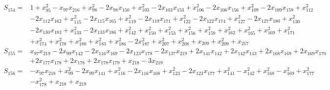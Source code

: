 \begin{align*}
S_{154}={}&1+x_{95}^{2}-x_{97}x_{216}+x_{98}^{2}-2x_{98}x_{150}+x_{103}^{2}-2x_{103}x_{153}+x_{106}^{2}-2x_{106}x_{156}+x_{109}^{2}-2x_{109}x_{159}+x_{112}^{2}\\
{}&-2x_{112}x_{162}+x_{115}^{2}-2x_{115}x_{165}+x_{119}^{2}-2x_{119}x_{171}+x_{122}^{2}-2x_{122}x_{174}+x_{127}^{2}-2x_{127}x_{180}+x_{130}^{2}\\
{}&-2x_{130}x_{183}+x_{133}^{2}-2x_{133}x_{186}+x_{142}^{2}+x_{150}^{2}+x_{153}^{2}+x_{156}^{2}+x_{159}^{2}+x_{162}^{2}+x_{165}^{2}+x_{169}^{2}+x_{171}^{2}\\
{}&+x_{174}^{2}+x_{178}^{2}+x_{180}^{2}+x_{183}^{2}+x_{186}^{2}-2x_{187}^{2}+x_{207}^{2}+x_{208}^{2}+x_{209}+x_{209}^{2}+x_{217}
\end{align*}
\begin{align*}
S_{155}={}&x_{97}x_{219}-2x_{99}x_{142}-2x_{116}x_{169}-2x_{123}x_{178}-2x_{137}x_{219}+2x_{141}x_{142}+2x_{142}x_{143}+2x_{168}x_{169}+2x_{169}x_{170}\\
{}&+2x_{177}x_{178}+2x_{178}+2x_{178}x_{179}+x_{218}-3x_{219}
\end{align*}
\begin{align*}
S_{156}={}&-x_{97}x_{218}+x_{99}^{2}-2x_{99}x_{141}+x_{116}^{2}-2x_{116}x_{168}+x_{123}^{2}-2x_{123}x_{177}+x_{141}^{2}-x_{142}^{2}+x_{168}^{2}-x_{169}^{2}+x_{177}^{2}\\
{}&-x_{178}^{2}+x_{218}+x_{219}
\end{align*}
